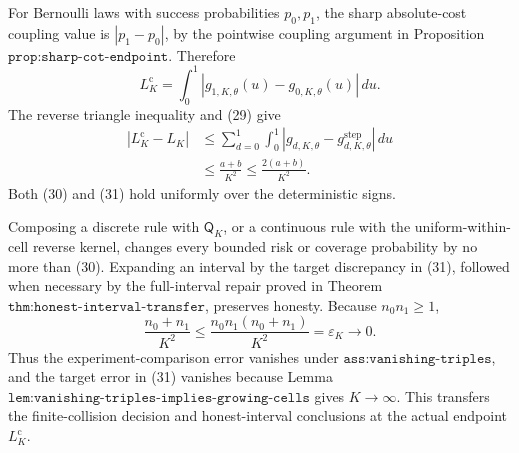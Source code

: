 For Bernoulli laws with success probabilities \(p_0,p_1\), the sharp
absolute-cost coupling value is \(|p_1-p_0|\), by the pointwise
coupling argument in Proposition
\(\texttt{prop:sharp-cot-endpoint}\).  Therefore
\[
 L_K^{\mathrm c}
 =\int_0^1|g_{1,K,\theta}(u)-g_{0,K,\theta}(u)|\,du.
\]
The reverse triangle inequality and (29) give
\[
\begin{aligned}
 |L_K^{\mathrm c}-L_K|
 &\le
 \sum_{d=0}^1\int_0^1
 |g_{d,K,\theta}-g^{\mathrm{step}}_{d,K,\theta}|\,du\\
 &\le\frac{a+b}{K^2}
 \le\frac{2(a+b)}{K^2}.
\end{aligned}
 \tag{31}
\]
Both (30) and (31) hold uniformly over the deterministic signs.

Composing a discrete rule with \(\mathsf Q_K\), or a continuous rule
with the uniform-within-cell reverse kernel, changes every bounded risk
or coverage probability by no more than (30).  Expanding an interval
by the target discrepancy in (31), followed when necessary by the
full-interval repair proved in Theorem
\(\texttt{thm:honest-interval-transfer}\), preserves honesty.  Because
\(n_0n_1\ge1\),
\[
 \frac{n_0+n_1}{K^2}
 \le\frac{n_0n_1(n_0+n_1)}{K^2}
 =\varepsilon_K\longrightarrow0.
 \tag{32}
\]
Thus the experiment-comparison error vanishes under
\(\texttt{ass:vanishing-triples}\), and the target error in (31)
vanishes because Lemma
\(\texttt{lem:vanishing-triples-implies-growing-cells}\) gives
\(K\to\infty\).  This transfers the finite-collision decision and
honest-interval conclusions at the actual endpoint
\(L_K^{\mathrm c}\).

